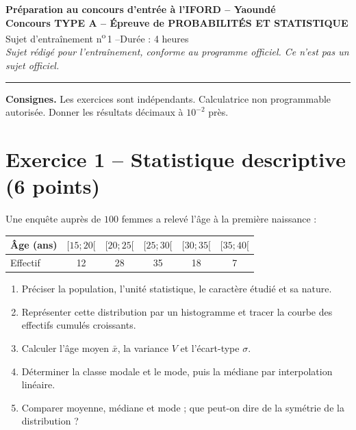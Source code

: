 \documentclass[11pt,a4paper]{article}
\begin{document}
\begin{center}
{\large\bfseries Préparation au concours d'entrée à l'IFORD -- Yaoundé}\\[2mm]
{\Large\bfseries Concours TYPE A -- Épreuve de PROBABILITÉS ET STATISTIQUE}\\[2mm]
Sujet d'entraînement n\textsuperscript{o}\,1 \quad --\quad Durée : 4 heures\\[1mm]
\emph{Sujet rédigé pour l'entraînement, conforme au programme officiel. Ce n'est pas un sujet officiel.}
\end{center}
\hrule\medskip

\noindent\textbf{Consignes.} Les exercices sont indépendants. Calculatrice non programmable autorisée.
Donner les résultats décimaux à $10^{-2}$ près.

\section*{Exercice 1 -- Statistique descriptive (6 points)}
Une enquête auprès de $100$ femmes a relevé l'âge à la première naissance :
\begin{center}
\begin{tabular}{lccccc}
\toprule
Âge (ans) & $[15;20[$ & $[20;25[$ & $[25;30[$ & $[30;35[$ & $[35;40[$\\
\midrule
Effectif & 12 & 28 & 35 & 18 & 7\\
\bottomrule
\end{tabular}
\end{center}
\begin{enumerate}
  \item Préciser la population, l'unité statistique, le caractère étudié et sa nature.
  \item Représenter cette distribution par un histogramme et tracer la courbe des effectifs cumulés croissants.
  \item Calculer l'âge moyen $\bar{x}$, la variance $V$ et l'écart-type $\sigma$.
  \item Déterminer la classe modale et le mode, puis la médiane par interpolation linéaire.
  \item Comparer moyenne, médiane et mode ; que peut-on dire de la symétrie de la distribution ?
\end{enumerate}
\end{document}
